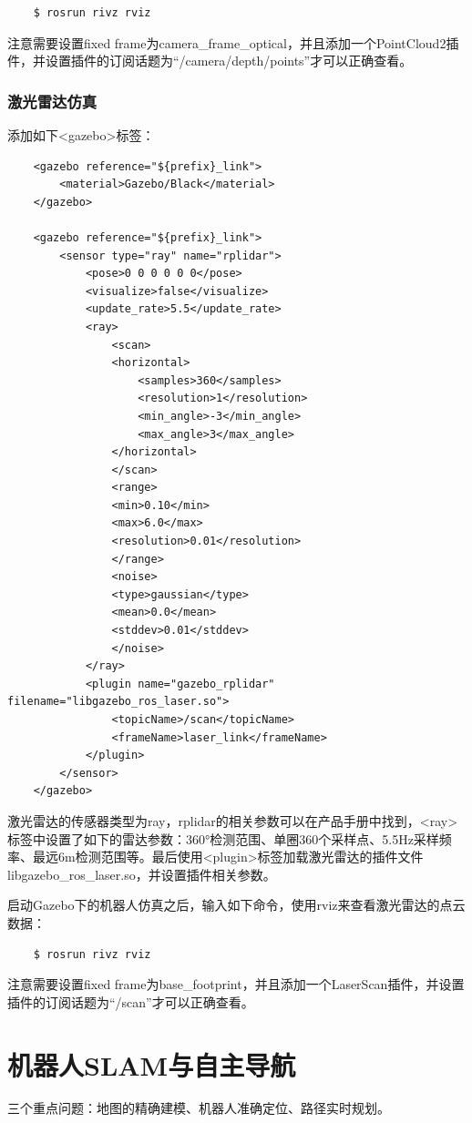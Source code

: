 \documentclass[10pt, oneside]{book}
\begin{document}
\begin{verbatim}
    $ rosrun rivz rviz
\end{verbatim}

注意需要设置fixed frame为camera\_frame\_optical，并且添加一个PointCloud2插件，并设置插件的订阅话题为“/camera/depth/points”才可以正确查看。

\subsection{激光雷达仿真}

添加如下<gazebo>标签：

\begin{verbatim}
    <gazebo reference="${prefix}_link">
        <material>Gazebo/Black</material>
    </gazebo>

    <gazebo reference="${prefix}_link">
        <sensor type="ray" name="rplidar">
            <pose>0 0 0 0 0 0</pose>
            <visualize>false</visualize>
            <update_rate>5.5</update_rate>
            <ray>
                <scan>
                <horizontal>
                    <samples>360</samples>
                    <resolution>1</resolution>
                    <min_angle>-3</min_angle>
                    <max_angle>3</max_angle>
                </horizontal>
                </scan>
                <range>
                <min>0.10</min>
                <max>6.0</max>
                <resolution>0.01</resolution>
                </range>
                <noise>
                <type>gaussian</type>
                <mean>0.0</mean>
                <stddev>0.01</stddev>
                </noise>
            </ray>
            <plugin name="gazebo_rplidar" filename="libgazebo_ros_laser.so">
                <topicName>/scan</topicName>
                <frameName>laser_link</frameName>
            </plugin>
        </sensor>
    </gazebo>
\end{verbatim}

激光雷达的传感器类型为ray，rplidar的相关参数可以在产品手册中找到，<ray>标签中设置了如下的雷达参数：360°检测范围、单圈360个采样点、5.5Hz采样频率、最远6m检测范围等。最后使用<plugin>标签加载激光雷达的插件文件libgazebo\_ros\_laser.so，并设置插件相关参数。

启动Gazebo下的机器人仿真之后，输入如下命令，使用rviz来查看激光雷达的点云数据：

\begin{verbatim}
    $ rosrun rivz rviz
\end{verbatim}

注意需要设置fixed frame为base\_footprint，并且添加一个LaserScan插件，并设置插件的订阅话题为“/scan”才可以正确查看。

\chapter{机器人SLAM与自主导航}

三个重点问题：地图的精确建模、机器人准确定位、路径实时规划。
\end{document}
